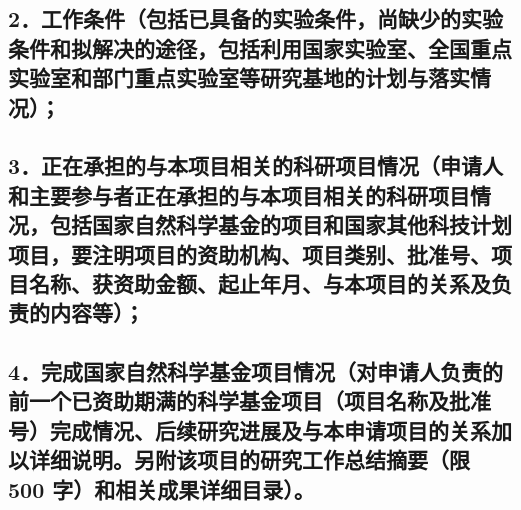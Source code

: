 \documentclass[12pt,UTF8,AutoFakeBold=2.5,a4paper,fontset=none]{ctexart} %
\begin{document}


\subsection{\texorpdfstring{2．\textbf{工作条件}（包括已具备的实验条件，尚缺少的实验条件和拟解\linebreak{}决的途径，包括利用国家实验室、全国重点实验室和部门重点实验室\linebreak{}等研究基地的计划与落实情况）；}{2．工作条件（包括已具备的实验条件，尚缺少的实验条件和拟解决的途径，包括利用国家实验室、全国重点实验室和部门重点实验室等研究基地的计划与落实情况）；}}



\subsection{\texorpdfstring{3．\textbf{正在承担的与本项目相关的科研项目情况}\hspace{0.2em}（申请人和主要参与\linebreak{}者正在承担的与本项目相关的科研项目情况，包括国家自然科学基金\linebreak{}的项目和国家其他科技计划项目，要注明项目的资助机构、项目类别、\linebreak{}批准号、项目名称、获资助金额、起止年月、与本项目的关系及负责\linebreak{}的内容等）；}{3．正在承担的与本项目相关的科研项目情况（申请人和主要参与者正在承担的与本项目相关的科研项目情况，包括国家自然科学基金的项目和国家其他科技计划项目，要注明项目的资助机构、项目类别、批准号、项目名称、获资助金额、起止年月、与本项目的关系及负责的内容等）；}}



\subsection{\texorpdfstring{4．\textbf{完成国家自然科学基金项目情况}（对申请人负责的前一个已资\linebreak{}助期满的科学基金项目（项目名称及批准号）完成情况、后续研究进\linebreak{}展及与本申请项目的关系加以详细说明。另附该项目的研究工作总结\linebreak{}摘要（限 500 字）和相关成果详细目录）。}{4．完成国家自然科学基金项目情况（对申请人负责的前一个已资助期满的科学基金项目（项目名称及批准号）完成情况、后续研究进展及与本申请项目的关系加以详细说明。另附该项目的研究工作总结摘要（限 500 字）和相关成果详细目录）。}}
\end{document}
